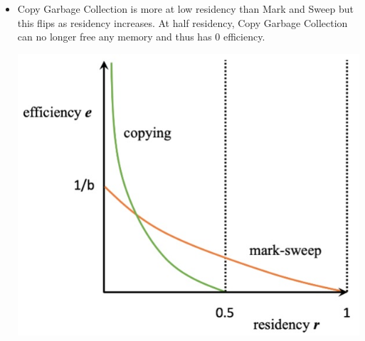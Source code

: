 \begin{itemize}
    \item Copy Garbage Collection is more at low residency than Mark and Sweep but this flips as residency increases. At half residency, Copy Garbage Collection can no longer free any memory and thus has 0 efficiency.
    \begin{center}
        \includegraphics[scale=0.5]{images/efficiency graph.jpg}
    \end{center}
\end{itemize}